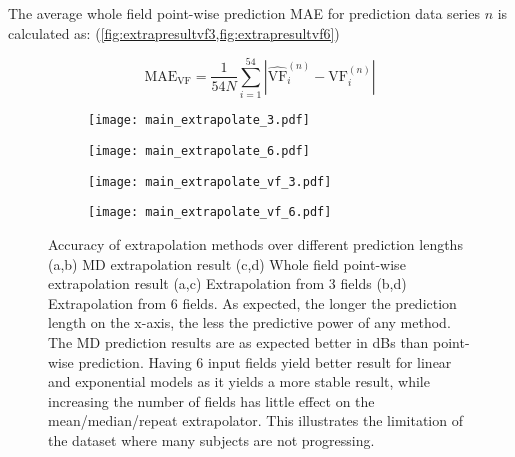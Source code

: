 The average whole field point-wise prediction \ac{MAE} for prediction data series $n$ is calculated as: (\cref{fig:extrapresultvf3,fig:extrapresultvf6})

\begin{equation}
\textrm{MAE}_{\textrm{VF}} = \frac{1}{54N}\sum_{i=1}^{54}\left|\widehat{\textrm{VF}}_i^{(n)}-\textrm{VF}_i^{(n)} \right|
\end{equation}

\begin{figure}[p]
	\centering
	\begin{subfigure}{0.49\textwidth}
		\centering
		\texttt{[image: main\_extrapolate\_3.pdf]}
		\caption{}
		\label{fig:extrapresultmd3}
	\end{subfigure}
	\begin{subfigure}{0.49\textwidth}
		\centering
		\texttt{[image: main\_extrapolate\_6.pdf]}
		\caption{}
		\label{fig:extrapresultmd6}
	\end{subfigure}

	\hfill
	
	\begin{subfigure}{0.49\textwidth}
		\centering
		\texttt{[image: main\_extrapolate\_vf\_3.pdf]}
		\caption{}
		\label{fig:extrapresultvf3}
	\end{subfigure}
	\begin{subfigure}{0.49\textwidth}
		\centering
		\texttt{[image: main\_extrapolate\_vf\_6.pdf]}
		\caption{}
		\label{fig:extrapresultvf6}
	\end{subfigure}

	\caption[Accuracy of extrapolation methods over different prediction lengths on the Rotterdam dataset]{Accuracy of extrapolation methods over different prediction lengths (a,b) MD extrapolation result (c,d) Whole field point-wise extrapolation result (a,c) Extrapolation from 3 fields (b,d) Extrapolation from 6 fields. As expected, the longer the prediction length on the x-axis, the less the predictive power of any method. The MD prediction results are as expected better in dBs than point-wise prediction. Having 6 input fields yield better result for linear and exponential models as it yields a more stable result, while increasing the number of fields has little effect on the mean/median/repeat extrapolator. This illustrates the limitation of the dataset where many subjects are not progressing. }
	\label{fig:extrapresult}

\end{figure}


